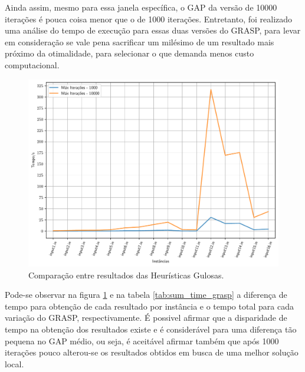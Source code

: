 \documentclass[a4paper, 12pt]{article}
\begin{document}
Ainda assim, mesmo para essa janela específica, o GAP da versão de 10000 iterações é pouca coisa menor que o de 1000 iterações.
Entretanto, foi realizado uma análise do tempo de execução para essas duas versões do GRASP, para levar
em consideração se vale pena sacrificar um milésimo de um resultado mais próximo da otimalidade, para 
selecionar o que demanda menos custo computacional.




\begin{figure}[h]
    \centering
    \includegraphics[width=0.7\linewidth]{../imgs/grasp_compare_1kvs10k.pdf}
    \caption{Comparação entre resultados das Heurísticas Gulosas.}
    \label{grasp_compare_1kvs10k}
\end{figure}

Pode-se observar na figura \ref{grasp_compare_1kvs10k} e na tabela \ref{tab:sum_time_grasp} 
a diferença de tempo para obtenção de cada resultado por instância e o tempo total para cada variação do GRASP, respectivamente.
É possivel afirmar que a disparidade 
de tempo na obtenção dos resultados existe e é considerável para uma diferença tão pequena no GAP médio, ou seja, é aceitável
afirmar também que após 1000 iterações pouco alterou-se os resultados obtidos em busca de uma 
melhor solução local. 
\end{document}
